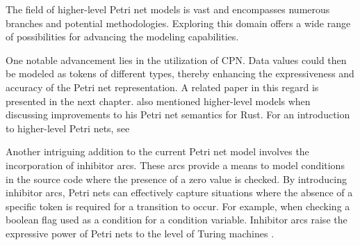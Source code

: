 The field of higher-level Petri net models is vast
and encompasses numerous branches and potential methodologies.
Exploring this domain offers a wide range of possibilities for advancing the modeling capabilities.

One notable advancement lies in the utilization of \acrfull{CPN}.
Data values could then be modeled as tokens of different types,
thereby enhancing the expressiveness and accuracy of the Petri net representation.
A related paper in this regard is presented in the next chapter.
\cite{meyer2020} also mentioned higher-level models
when discussing improvements to his Petri net semantics for Rust.
For an introduction to higher-level Petri nets, see \cite{murata1989}

Another intriguing addition to the current Petri net model
involves the incorporation of inhibitor arcs.
These arcs provide a means to model conditions in the source code
where the presence of a zero value is checked.
By introducing inhibitor arcs,
Petri nets can effectively capture situations
where the absence of a specific token is required for a transition to occur.
For example, when checking a boolean flag used as a condition for a condition variable.
Inhibitor arcs raise the expressive power of Petri nets
to the level of Turing machines \cite{peterson1981}.